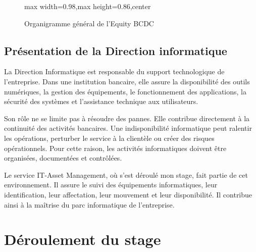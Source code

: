 \documentclass[12pt,a4paper]{report}
\begin{document}
\begin{landscape}
\begin{figure}[p]
\begin{adjustbox}{max width=0.98\linewidth,max height=0.86\textheight,center}
\end{adjustbox}

\caption{Organigramme général de l'Equity BCDC}
\label{fig:organigramme-equity-bcdc}

\end{figure}
\end{landscape}
\clearpage

\section{Présentation de la Direction informatique}

La Direction Informatique est responsable du support technologique de l'entreprise. Dans une institution bancaire, elle assure la disponibilité des outils numériques, la gestion des équipements, le fonctionnement des applications, la sécurité des systèmes et l'assistance technique aux utilisateurs.

Son rôle ne se limite pas à résoudre des pannes. Elle contribue directement à la continuité des activités bancaires. Une indisponibilité informatique peut ralentir les opérations, perturber le service à la clientèle ou créer des risques opérationnels. Pour cette raison, les activités informatiques doivent être organisées, documentées et contrôlées.

Le service IT-Asset Management, où s'est déroulé mon stage, fait partie de cet environnement. Il assure le suivi des équipements informatiques, leur identification, leur affectation, leur mouvement et leur disponibilité. Il contribue ainsi à la maîtrise du parc informatique de l'entreprise.

\chapter{Déroulement du stage}
\end{document}
